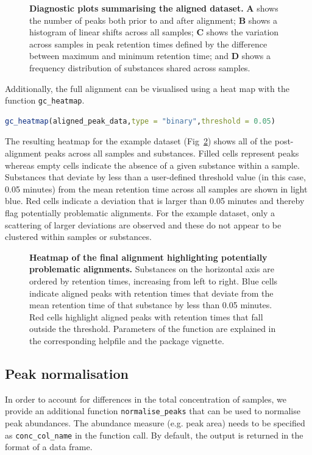 \documentclass[10pt,letterpaper]{article}
\begin{document}
\begin{figure}[htbp]
\centering
\caption{\textbf{Diagnostic plots summarising the aligned dataset.}
\textbf{A} shows the number of peaks both prior to and after alignment; \textbf{B} shows a histogram of linear shifts across all samples; \textbf{C} shows the variation across samples in peak retention times defined by the difference between maximum and minimum retention time; and \textbf{D} shows a frequency distribution of substances shared across samples.}
\label{Fig:Fig3}
\end{figure} 

Additionally, the full alignment can be visualised using a heat map with the function \texttt{gc\_heatmap}.

\begin{lstlisting}[language=R]
gc_heatmap(aligned_peak_data,type = "binary",threshold = 0.05)
\end{lstlisting}

The resulting heatmap for the example dataset (Fig~\ref{Fig:Fig4}) shows all of the post-alignment peaks across all samples and substances.  Filled cells represent peaks whereas empty cells indicate the absence of a given substance within a sample. Substances that deviate by less than a user-defined threshold value (in this case, 0.05 minutes) from the mean retention time across all samples are shown in light blue. Red cells indicate a deviation that is larger than 0.05 minutes and thereby flag potentially problematic alignments. For the example dataset, only a scattering of larger deviations are observed and these do not appear to be clustered within samples or substances.

\begin{figure}[htbp]
\centering
\caption{\textbf{Heatmap of the final alignment highlighting potentially problematic alignments.} 
Substances on the horizontal axis are ordered by retention times, increasing from left to right. Blue cells indicate aligned peaks with retention times that deviate from the mean retention time of that substance by less than 0.05 minutes.  Red cells highlight aligned peaks with retention times that fall outside the threshold. Parameters of the function are explained in the corresponding helpfile and the package vignette.}
\label{Fig:Fig4}
\end{figure} 

\subsection*{Peak normalisation}
In order to account for differences in the total concentration of samples, we provide an additional function \texttt{normalise\_peaks} that can be used to normalise peak abundances. The abundance measure (e.g. peak area) needs to be specified as \texttt{conc\_col\_name} in the function call. By default, the output is returned in the format of a data frame. 
\end{document}
